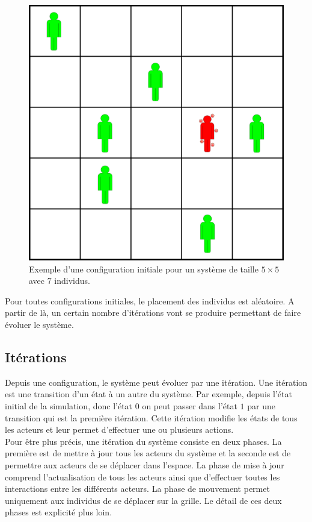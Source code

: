 \begin{figure}[h]
	\centering
	\captionsetup{justification=centering}
	\includegraphics[scale=0.5]{Images/configuration_initiale.png}
	\caption[Configuration initiale]{Exemple d'une configuration initiale pour un système de taille $5\times 5$ avec $7$ individus.}
\end{figure}

Pour toutes configurations initiales, le placement des individus est aléatoire. A partir de là, un certain nombre d'itérations vont se produire permettant de faire évoluer le système.

\subsection{Itérations}

Depuis une configuration, le système peut évoluer par une itération. Une itération est une transition d'un état à un autre du système. Par exemple, depuis l'état initial de la simulation, donc l'état $0$ on peut passer dans l'état $1$ par une transition qui est la première itération. Cette itération modifie les états de tous les acteurs et leur permet d'effectuer une ou plusieurs actions.\\

Pour être plus précis, une itération du système consiste en deux phases. La première est de mettre à jour tous les acteurs du système et la seconde est de permettre aux acteurs de se déplacer dans l'espace. La phase de mise à jour comprend l'actualisation de tous les acteurs ainsi que d'effectuer toutes les interactions entre les différents acteurs. La phase de mouvement permet uniquement aux individus de se déplacer sur la grille. Le détail de ces deux phases est explicité plus loin.\\

